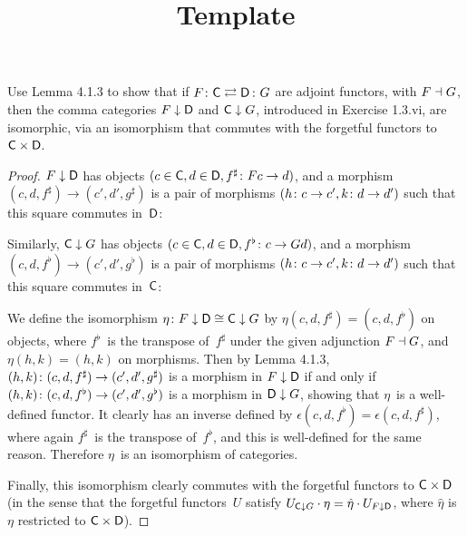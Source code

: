 \documentclass[../../solutions]{subfiles}
\title{Template}
\author{}
\begin{document}
\maketitle

%   

\begin{exercise}
  Use Lemma 4.1.3 to show that if $\afunc{F}{G}{\sC}{\sD}$ are adjoint
  functors, with $F\dashv G$, then the comma categories $F\downarrow
  {\mathsf{D}}$ and ${\mathsf{C}}\downarrow G$, introduced in Exercise 1.3.vi, are
  isomorphic, via an isomorphism that commutes with the forgetful
  functors to ${\mathsf{C}}\times{\mathsf{D}}$.
\end{exercise}

\begin{proof}
  $F\downarrow{\mathsf{D}}$ has objects
  $(c\in{\mathsf{C}}, d\in{\mathsf{D}}, {f^\sharp}\colon{Fc}\to{d})$, and a morphism
  $(c,d,f^\sharp)\to(c',d',g^\sharp)$ is a pair of morphisms
  $({h}\colon{c}\to{c'}, {k}\colon{d}\to{d'})$ such that this square commutes
  in~${\mathsf{D}}$:
  \begin{center}
  \end{center}

  Similarly, ${\mathsf{C}}\downarrow G$ has objects
  $(c\in{\mathsf{C}}, d\in{\mathsf{D}}, {f^\flat}\colon{c}\to{Gd})$, and a morphism
  $(c,d,f^\flat)\to(c',d',g^\flat)$ is a pair of morphisms
  $({h}\colon{c}\to{c'}, {k}\colon{d}\to{d'})$ such that this square commutes
  in~${\mathsf{C}}$:
  \begin{center}
  \end{center}

  We define the isomorphism
  ${\eta}\colon{F\downarrow{\mathsf{D}}}\cong{{\mathsf{C}}\downarrow G}$ by
  $\eta(c,d,f^\sharp)=(c,d,f^\flat)$ on objects, where $f^\flat$~is
  the transpose of~$f^\sharp$ under the given adjunction $F\dashv G$,
  and $\eta(h,k)=(h,k)$ on morphisms.  Then by Lemma 4.1.3,
  ${(h,k)}\colon{(c,d,f^\sharp)}\to{(c',d',g^\sharp)}$ is a morphism in
  $F\downarrow{\mathsf{D}}$ if and only if
  ${(h,k)}\colon{(c,d,f^\flat)}\to{(c',d',g^\flat)}$ is a morphism in
  ${\mathsf{D}}\downarrow G$, showing that $\eta$~is a well-defined functor.
  It clearly has an inverse defined by
  $\epsilon(c,d,f^\flat)=\epsilon(c,d,f^\sharp)$, where again
  $f^\sharp$~is the transpose of~$f^\flat$, and this is well-defined
  for the same reason.  Therefore $\eta$~is an isomorphism of
  categories.

  Finally, this isomorphism clearly commutes with the forgetful
  functors to ${\mathsf{C}}\times {\mathsf{D}}$ (in the sense that the forgetful
  functors~$U$ satisfy
  $U_{{\mathsf{C}}\downarrow G}\cdot\eta = \hat{\eta}\cdot U_{F\downarrow
    {\mathsf{D}}}$, where $\hat{\eta}$ is $\eta$ restricted to
  ${\mathsf{C}}\times {\mathsf{D}}$).
\end{proof}
\end{document}

